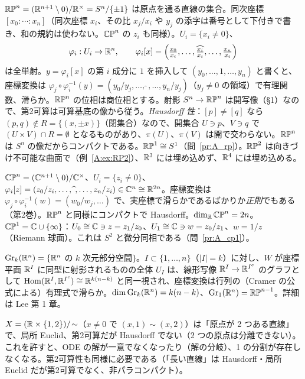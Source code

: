 \begin{ex}[実射影空間 $\RP^n$]\label{A:ex:RPn}
$\mathbb{RP}^n=(\mathbb R^{n+1}\setminus0)/\mathbb R^\times=S^n/\{\pm1\}$ は原点を通る直線の集合。同次座標 $[x_0:\cdots:x_n]$（同次座標 $x_i$、その比 $x_j/x_i$ や $y_j$ の添字は番号として下付きで書き、和の規約は使わない。$\CP^n$ の $z_i$ も同様）。$U_i=\{x_i\ne0\}$、
\[
\varphi_i:U_i\to\mathbb R^n,\qquad\varphi_i[x]=\Bigl(\tfrac{x_0}{x_i},\dots,\widehat{\tfrac{x_i}{x_i}},\dots,\tfrac{x_n}{x_i}\Bigr)
\]
は全単射。$y=\varphi_i[x]$ の第 $i$ 成分に $1$ を挿入して $(y_0,\dots,1,\dots,y_n)$ と書くと、座標変換は $\varphi_j\circ\varphi_i^{-1}(y)=(y_0/y_j,\dots,\widehat{\;},\dots,y_n/y_j)$（$y_j\ne0$ の領域）で有理関数、滑らか。$\RP^n$ の位相は商位相とする。射影 $S^n\to\mathbb{RP}^n$ は開写像（§1）なので、第2可算は可算基底の像から従う。\emph{Hausdorff 性}：$[p]\ne[q]$ なら $(p,q)\notin R=\{(x,\pm x)\}$（閉集合）なので、開集合 $U\ni p$、$V\ni q$ で $(U\times V)\cap R=\emptyset$ となるものがあり、$\pi(U)$、$\pi(V)$ は開で交わらない。$\RP^n$ は $S^n$ の像だからコンパクトである。$\mathbb{RP}^1\cong S^1$（問~\ref{pr:A_rp}）。$\mathbb{RP}^2$ は向きづけ不可能な曲面で（例~\ref{A:ex:RP2}）、$\mathbb R^3$ には埋め込めず、$\mathbb R^4$ には埋め込める\tC。
\end{ex}

\begin{ex}[複素射影空間 $\CP^n$]\label{A:ex:CPn}
$\mathbb{CP}^n=(\mathbb C^{n+1}\setminus0)/\mathbb C^\times$、$U_i=\{z_i\ne0\}$、$\varphi_i[z]=(z_0/z_i,\dots,\widehat{\;},\dots,z_n/z_i)\in\mathbb C^n\cong\mathbb R^{2n}$。座標変換は $\varphi_j\circ\varphi_i^{-1}(w)=(w_0/w_j,\dots)$ で、実座標で滑らかであるばかりか\emph{正則}でもある（第2巻）。$\RP^n$ と同様にコンパクトで Hausdorff。$\dim_{\mathbb R}\mathbb{CP}^n=2n$。$\mathbb{CP}^1=\mathbb C\cup\{\infty\}$：$U_0\cong\mathbb C\ni z=z_1/z_0$、$U_1\cong\mathbb C\ni w=z_0/z_1$、$w=1/z$（Riemann 球面）。これは $S^2$ と微分同相である（問~\ref{pr:A_cp1}）。
\end{ex}

\begin{ex}
$\mathrm{Gr}_k(\mathbb R^n)=\{\mathbb R^n$ の $k$ 次元部分空間$\}$。$I\subset\{1,\dots,n\}$（$|I|=k$）に対し、$W$ が座標平面 $\mathbb R^I$ に同型に射影されるものの全体 $U_I$ は、線形写像 $\mathbb R^I\to\mathbb R^{I^c}$ のグラフとして $\mathrm{Hom}(\mathbb R^I,\mathbb R^{I^c})\cong\mathbb R^{k(n-k)}$ と同一視され、座標変換は行列の（Cramer の公式による）有理式で滑らか。$\dim\mathrm{Gr}_k(\mathbb R^n)=k(n-k)$、$\mathrm{Gr}_1(\mathbb R^n)=\mathbb{RP}^{n-1}$。詳細は Lee 第 1 章。\tC
\end{ex}

\begin{ex}\label{A:ex:twoorigin}
$X=(\mathbb R\times\{1,2\})/\!\sim$（$x\ne0$ で $(x,1)\sim(x,2)$）は「原点が 2 つある直線」で、局所 Euclid、第2可算だが Hausdorff でない（2 つの原点は分離できない）。これを許すと、ODE の解が一意でなくなったり（解の分岐）、1 の分割が存在しなくなる。第2可算性も同様に必要である（「長い直線」は Hausdorff・局所 Euclid だが第2可算でなく、非パラコンパクト）。
\end{ex}


